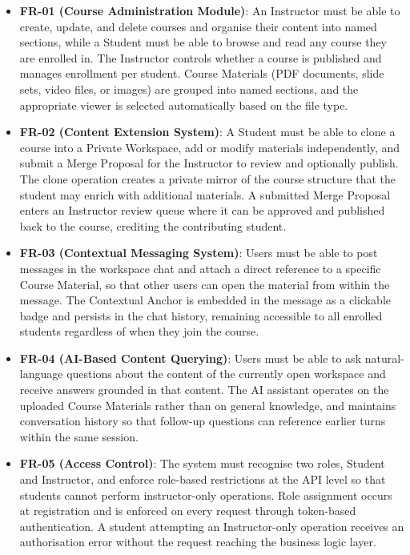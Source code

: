 \begin{itemize}
    \item \textbf{FR-01 (Course Administration Module)}:
          An Instructor must be able to create, update, and delete courses and organise their content into
          named sections, while a Student must be able to browse and read any course they are enrolled in.
          The Instructor controls whether a course is published and manages enrollment per student.
          Course Materials (PDF documents, slide sets, video files, or images) are grouped into named
          sections, and the appropriate viewer is selected automatically based on the file type.

    \item \textbf{FR-02 (Content Extension System)}:
          A Student must be able to clone a course into a Private Workspace, add or modify materials
          independently, and submit a Merge Proposal for the Instructor to review and optionally publish.
          The clone operation creates a private mirror of the course structure that the student may enrich
          with additional materials. A submitted Merge Proposal enters an Instructor review queue where
          it can be approved and published back to the course, crediting the contributing student.

    \item \textbf{FR-03 (Contextual Messaging System)}:
          Users must be able to post messages in the workspace chat and attach a direct reference to a
          specific Course Material, so that other users can open the material from within the message.
          The Contextual Anchor is embedded in the message as a clickable badge and persists in the chat
          history, remaining accessible to all enrolled students regardless of when they join the course.

    \item \textbf{FR-04 (AI-Based Content Querying)}:
          Users must be able to ask natural-language questions about the content of the currently open
          workspace and receive answers grounded in that content.
          The AI assistant operates on the uploaded Course Materials rather than on general knowledge,
          and maintains conversation history so that follow-up questions can reference earlier turns
          within the same session.

    \item \textbf{FR-05 (Access Control)}:
          The system must recognise two roles, Student and Instructor, and enforce role-based restrictions
          at the API level so that students cannot perform instructor-only operations.
          Role assignment occurs at registration and is enforced on every request through token-based
          authentication. A student attempting an Instructor-only operation receives an authorisation
          error without the request reaching the business logic layer.
\end{itemize}

